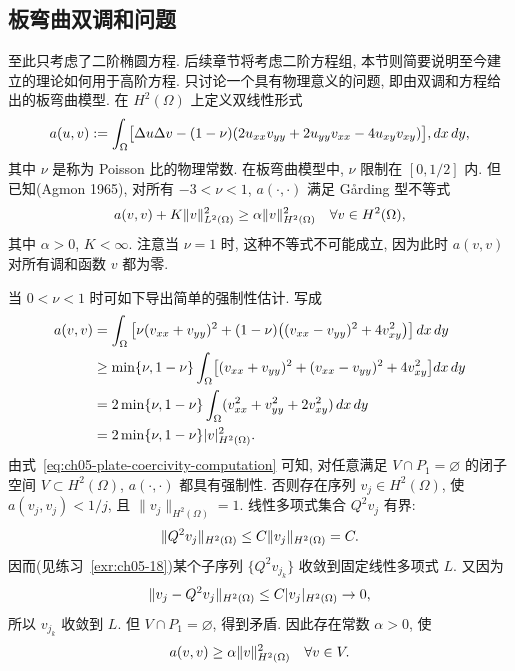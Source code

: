 \subsection{板弯曲双调和问题}
\label{sec:ch05-plate-bending-biharmonic-problem}
\setcounter{thmcount}{0}
\setcounter{equation}{0}

至此只考虑了二阶椭圆方程. 后续章节将考虑二阶方程组, 本节则简要说明至今建立的理论如何用于高阶方程. 只讨论一个具有物理意义的问题, 即由双调和方程给出的板弯曲模型. 在 $H^2(\Omega)$ 上定义双线性形式
\[
\MathBookFormulaID{formula-ch05-plate-bending-bilinear-form}
a(u,v):=\int_\Omega\bigl[
\Delta u\Delta v-(1-\nu)(2u_{xx}v_{yy}+2u_{yy}v_{xx}-4u_{xy}v_{xy})
\bigr],dx\,dy,
\]
其中 $\nu$ 是称为 Poisson 比的物理常数. 在板弯曲模型中, $\nu$ 限制在 $[0,1/2]$ 内. 但已知(Agmon 1965), 对所有 $-3<\nu<1$, $a(\cdot,\cdot)$ 满足 Gårding 型不等式
\begin{equation}
\MathBookFormulaID{formula-ch05-plate-garding-inequality}
\label{eq:ch05-plate-garding-inequality}
a(v,v)+K\|v\|_{L^2(\Omega)}^2
\geq\alpha\|v\|_{H^2(\Omega)}^2
\quad\forall v\in H^2(\Omega),
\end{equation}
其中 $\alpha>0$, $K<\infty$. 注意当 $\nu=1$ 时, 这种不等式不可能成立, 因为此时 $a(v,v)$ 对所有调和函数 $v$ 都为零.

当 $0<\nu<1$ 时可如下导出简单的强制性估计. 写成
\begin{equation}
\MathBookFormulaID{formula-ch05-plate-coercivity-computation}
\label{eq:ch05-plate-coercivity-computation}
\begin{aligned}
a(v,v)
&=\int_\Omega\left[\nu(v_{xx}+v_{yy})^2
+(1-\nu)\bigl((v_{xx}-v_{yy})^2+4v_{xy}^2\bigr)\right]dx\,dy\\
&\geq\min\{\nu,1-\nu\}\int_\Omega
\bigl[(v_{xx}+v_{yy})^2+(v_{xx}-v_{yy})^2+4v_{xy}^2\bigr]dx\,dy\\
&=2\min\{\nu,1-\nu\}\int_\Omega(v_{xx}^2+v_{yy}^2+2v_{xy}^2)\,dx\,dy\\
&=2\min\{\nu,1-\nu\}|v|_{H^2(\Omega)}^2.
\end{aligned}
\end{equation}
由式~\eqref{eq:ch05-plate-coercivity-computation} 可知, 对任意满足 $V\cap P_1=\varnothing$ 的闭子空间 $V\subset H^2(\Omega)$, $a(\cdot,\cdot)$ 都具有强制性. 否则存在序列 $v_j\in H^2(\Omega)$, 使 $a(v_j,v_j)<1/j$, 且 $\|v_j\|_{H^2(\Omega)}=1$. 线性多项式集合 $Q^2v_j$ 有界:
\[
\MathBookFormulaID{formula-ch05-linear-polynomial-projection-bound}
\|Q^2v_j\|_{H^2(\Omega)}\leq C\|v_j\|_{H^2(\Omega)}=C.
\]
因而(见练习~\ref{exr:ch05-18})某个子序列 $\{Q^2v_{j_k}\}$ 收敛到固定线性多项式 $L$. 又因为
\[
\MathBookFormulaID{formula-ch05-linear-polynomial-approximation}
\|v_j-Q^2v_j\|_{H^2(\Omega)}\leq C|v_j|_{H^2(\Omega)}\to0,
\]
所以 $v_{j_k}$ 收敛到 $L$. 但 $V\cap P_1=\varnothing$, 得到矛盾. 因此存在常数 $\alpha>0$, 使
\begin{equation}
\MathBookFormulaID{formula-ch05-plate-subspace-coercivity}
\label{eq:ch05-plate-subspace-coercivity}
a(v,v)\geq\alpha\|v\|_{H^2(\Omega)}^2
\quad\forall v\in V.
\end{equation}

